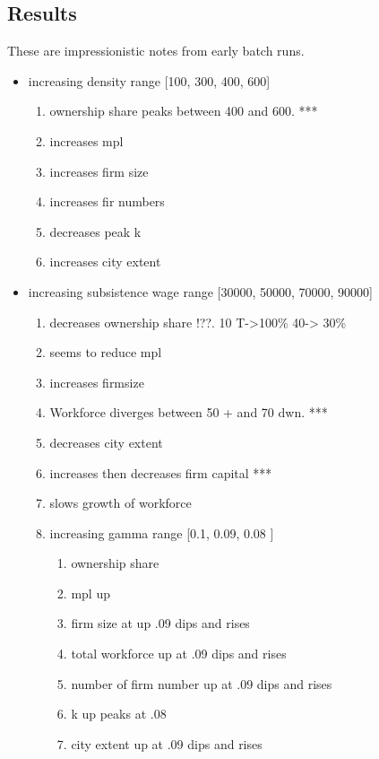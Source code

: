 \subsection{Results}
These are impressionistic notes from early batch runs.
\begin{itemize}
 \item increasing density range [100, 300, 400, 600]
    \begin{enumerate}
        \item ownership share peaks between 400 and 600. ***
        \item increases mpl
        \item increases firm size
        \item increases fir numbers
        \item decreases peak k
        \item increases city extent
    \end{enumerate}
    
    \item increasing subsistence wage range [30000, 50000, 70000, 90000]
    \begin{enumerate}
        \item decreases ownership share !??. 10 T->100\%  40-> 30\%
        \item seems to reduce mpl
        \item increases firmsize 
        \item Workforce diverges between 50 + and 70 dwn. ***
        \item decreases city extent
        \item increases then decreases firm capital ***
        \item slows growth of workforce

     \item increasing gamma range [0.1, 0.09, 0.08 ]
    \begin{enumerate}
        \item ownership share       
        \item mpl   up              
        \item firm size at up .09 dips and rises   
        \item total workforce up at .09 dips and rises
        \item number of firm number up at .09 dips and rises
        \item k    up peaks at .08                 
        \item city extent    up at .09 dips and rises          
    \end{enumerate}


\end{enumerate}
\end{itemize}
